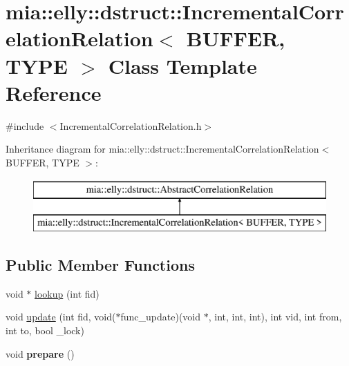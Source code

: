 \hypertarget{classmia_1_1elly_1_1dstruct_1_1_incremental_correlation_relation}{\section{mia\-:\-:elly\-:\-:dstruct\-:\-:Incremental\-Correlation\-Relation$<$ B\-U\-F\-F\-E\-R, T\-Y\-P\-E $>$ Class Template Reference}
\label{classmia_1_1elly_1_1dstruct_1_1_incremental_correlation_relation}
}


{\ttfamily \#include $<$Incremental\-Correlation\-Relation.\-h$>$}

Inheritance diagram for mia\-:\-:elly\-:\-:dstruct\-:\-:Incremental\-Correlation\-Relation$<$ B\-U\-F\-F\-E\-R, T\-Y\-P\-E $>$\-:\begin{figure}[H]
\begin{center}
\leavevmode
\includegraphics[height=2.000000cm]{classmia_1_1elly_1_1dstruct_1_1_incremental_correlation_relation}
\end{center}
\end{figure}
\subsection*{Public Member Functions}
\begin{DoxyCompactItemize}
\item 
void $\ast$ \hyperlink{classmia_1_1elly_1_1dstruct_1_1_incremental_correlation_relation_a64aa2490a44eb7bebf9accbeb9a04ab4}{lookup} (int fid)
\item 
void \hyperlink{classmia_1_1elly_1_1dstruct_1_1_incremental_correlation_relation_ac8e0e2c5f6650b12c157c3556cebcfc3}{update} (int fid, void($\ast$func\-\_\-update)(void $\ast$, int, int, int), int vid, int from, int to, bool \-\_\-lock)
\item 
\hypertarget{classmia_1_1elly_1_1dstruct_1_1_incremental_correlation_relation_a539746c25aac5cb61de67f6ab08ddcd6}{void {\bfseries prepare} ()}\label{classmia_1_1elly_1_1dstruct_1_1_incremental_correlation_relation_a539746c25aac5cb61de67f6ab08ddcd6}

\end{DoxyCompactItemize}
